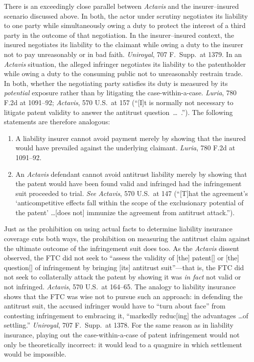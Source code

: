 \documentclass[
  12pt,
  letterpaper,
]{scrartcl}
\begin{document}
There is an exceedingly close parallel between \textit{Actavis} and the
insurer--insured scenario discussed above. In both, the actor under scrutiny
negotiates its liability to one party while simultaneously owing a duty to
protect the interest of a third party in the outcome of that negotiation.
In the insurer--insured context, the insured negotiates its liability to the
claimant while owing a duty to the insurer not to pay unreasonably or in bad
faith. \textit{Uniroyal}, 707 F.~Supp.~at 1379. In an \emph{Actavis} situation,
the alleged infringer negotiates its liability to the patentholder while owing
a duty to the consuming public not to unreasonably restrain trade. In both,
whether the negotiating party satisfies its duty is measured by its
\emph{potential} exposure rather than by litigating the case-within-a-case.
\textit{Luria}, 780 F.2d at 1091--92; \textit{Actavis}, 570 U.S.~at 157 (``[I]t
is normally not necessary to litigate patent validity to answer the antitrust
question~\ldots~.''). The following statements are therefore analogous:

{\vspace{5pt}%
\begin{enumerate}
  \item A liability insurer cannot avoid payment merely by showing that the
    insured would have prevailed against the underlying claimant.
    \textit{Luria}, 780 F.2d at 1091--92.
  \item An \textit{Actavis} defendant cannot avoid antitrust liability merely
    by showing that the patent would have been found valid and infringed had the 
    infringement suit proceeded to trial. \textit{See}
    \textit{Actavis}, 570 U.S.~at 147 (``[T]hat the agreement's
    `anticompetitive effects fall within the scope of the exclusionary
    potential of the patent' \ldots [does not] immunize the agreement from
    antitrust attack.'').
\end{enumerate}%
}\vspace{-12pt}%

Just as the prohibition on using actual facts to determine liability insurance
coverage cuts both ways, the prohibition on measuring the antitrust claim against the
ultimate outcome of the infringement suit does too. As the \textit{Actavis}
dissent observed, the FTC did not seek to ``assess the validity of [the]
patent[] or [the] question[] of infringement by bringing [its] antitrust
suit''---that is, the FTC did not seek to collaterally attack the patent by
showing it was \textit{in fact} not valid or not infringed. \textit{Actavis},
570 U.S.~at 164--65. The analogy to liability insurance shows that the FTC was
wise not to pursue such an approach: in defending the antitrust suit, the accused
infringer would have to ``turn about face'' from contesting infringement to
embracing it, ``markedly reduc[ing] the advantages \ldots of settling.''
\textit{Uniroyal}, 707 F.~Supp.~at 1378. For the same reason as in liability
insurance, playing out the case-within-a-case of patent infringement would not
only be theoretically incorrect: it would lead to a quagmire in which
settlement would be impossible.
\end{document}
